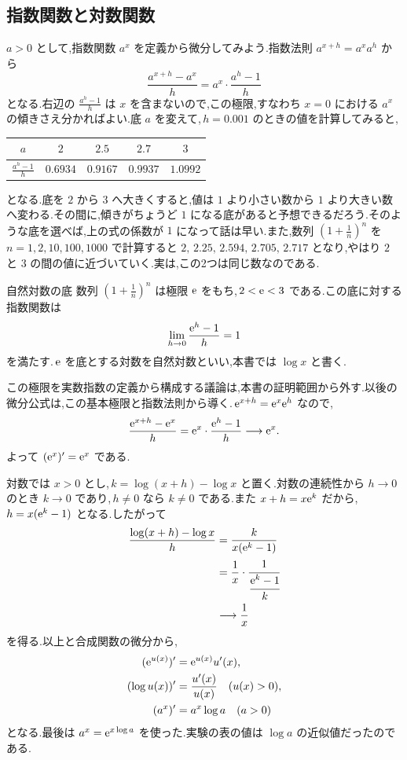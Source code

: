 \subsection{指数関数と対数関数}
$a>0$ として,指数関数 $a^x$ を定義から微分してみよう.指数法則 $a^{x+h}=a^xa^h$ から
\[
 \frac{a^{x+h}-a^x}{h}=a^x\cdot\frac{a^h-1}{h}
\]
となる.右辺の $\frac{a^h-1}{h}$ は $x$ を含まないので,この極限,すなわち $x=0$ における $a^x$ の傾きさえ分かればよい.底 $a$ を変えて,\,$h=0.001$ のときの値を計算してみると,
\begin{center}
\begin{tabular}{ccccc}
\toprule
$a$ & $2$ & $2.5$ & $2.7$ & $3$\\
\midrule
$\frac{a^h-1}{h}$ & $0.6934$ & $0.9167$ & $0.9937$ & $1.0992$\\
\bottomrule
\end{tabular}
\end{center}
となる.底を $2$ から $3$ へ大きくすると,値は $1$ より小さい数から $1$ より大きい数へ変わる.その間に,傾きがちょうど $1$ になる底があると予想できるだろう.そのような底を選べば,上の式の係数が $1$ になって話は早い.また,数列 $\left(1+\frac1n\right)^n$ を $n=1,2,10,100,1000$ で計算すると $2,\,2.25,\,2.594,\,2.705,\,2.717$ となり,やはり $2$ と $3$ の間の値に近づいていく.実は,この2つは同じ数なのである.

\begin{theorem}{自然対数の底}
数列 $\left(1+\frac1n\right)^n$ は極限 $\mathrm{e}$ をもち,\,$2<\mathrm{e}<3$ である.この底に対する指数関数は
\[
 \lim_{h\to0}\frac{\mathrm{e}^h-1}{h}=1
\]
を満たす.\,$\mathrm{e}$ を底とする対数を自然対数といい,本書では $\log x$ と書く.
\end{theorem}

この極限を実数指数の定義から構成する議論は,本書の証明範囲から外す.以後の微分公式は,この基本極限と指数法則から導く.\,$\mathrm{e}^{x+h}=\mathrm{e}^x\mathrm{e}^h$ なので,
\[
 \frac{\mathrm{e}^{x+h}-\mathrm{e}^x}{h}
 =\mathrm{e}^x\cdot\frac{\mathrm{e}^h-1}{h}\longrightarrow\mathrm{e}^x.
\]
よって $(\mathrm{e}^x)'=\mathrm{e}^x$ である.

対数では $x>0$ とし,\,$k=\log(x+h)-\log x$ と置く.対数の連続性から $h\to0$ のとき $k\to0$ であり,\,$h\ne0$ なら $k\ne0$ である.また $x+h=x\mathrm{e}^k$ だから,\,$h=x(\mathrm{e}^k-1)$ となる.したがって
\begin{align*}
 \frac{\log(x+h)-\log x}{h}
 &=\frac{k}{x(\mathrm{e}^k-1)}\\
 &=\frac1x\cdot\cfrac{1}{\cfrac{\mathrm{e}^k-1}{k}}\\
 &\longrightarrow\frac1x
\end{align*}
を得る.以上と合成関数の微分から,
\begin{align*}
 (\mathrm{e}^{u(x)})'&=\mathrm{e}^{u(x)}u'(x),\\
 (\log u(x))'&=\frac{u'(x)}{u(x)}\quad(u(x)>0),\\
 (a^x)'&=a^x\log a\quad(a>0)
\end{align*}
となる.最後は $a^x=\mathrm{e}^{x\log a}$ を使った.実験の表の値は $\log a$ の近似値だったのである.

